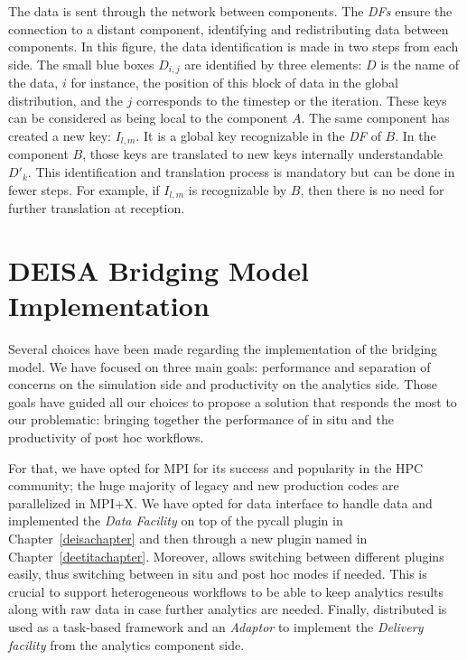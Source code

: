The data is sent through the network between components. The \textit{DFs} ensure the connection to a distant component, identifying and redistributing data between components. 
In this figure, the data identification is made in two steps from each side. The small blue boxes $D_{i,j}$ are identified by three elements: $D$ is the name of the data, $i$ for instance, the position of this block of data in the global distribution, and the $j$ corresponds to the timestep or the iteration. These keys can be considered as being local to the component $A$. 
The same component has created a new key: $I_{l,m}$. It is a global key recognizable in the \textit{DF} of $B$. In the component $B$, those keys are translated to new keys internally understandable $D'_{k}$. 
This identification and translation process is mandatory but can be done in fewer steps. For example, if $I_{l,m}$ is recognizable by $B$, then there is no need for further translation at reception.


\section{DEISA Bridging Model Implementation}\label{sec:btpimplementation}

Several choices have been made regarding the implementation of the bridging model. We have focused on three main goals: performance and separation of concerns on the simulation side and productivity on the analytics side. Those goals have guided all our choices to propose a solution that responds the most to our problematic: bringing together the performance of in situ and the productivity of post hoc workflows.

For that, we have opted for MPI for its success and popularity in the HPC community; the huge majority of legacy and new production codes are parallelized in MPI+X. 
We have opted for \pdi data interface to handle data and implemented the \textit{Data Facility} on top of the pycall plugin in Chapter~\ref{deisachapter} and then through a new \pdi plugin named \deisa in Chapter~\ref{deetitachapter}. 
Moreover, \pdi allows switching between different plugins easily, thus switching between in situ and post hoc modes if needed. This is crucial to support heterogeneous workflows to be able to keep analytics results along with raw data in case further analytics are needed. Finally, \dask distributed is used as a task-based framework and an \textit{Adaptor} to implement the \textit{Delivery facility} from the analytics component side.

